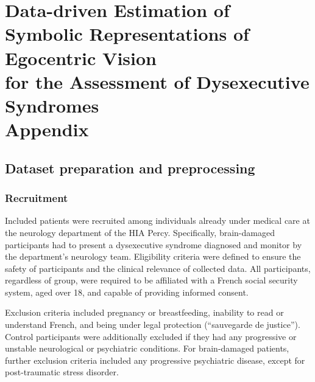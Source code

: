 \chapter[Appendix: Data-driven estimation of symbolic representations of egocentric vision for the assessment of dysexecutive syndromes]{Data-driven Estimation of \\Symbolic Representations of Egocentric Vision \\ for the Assessment of Dysexecutive Syndromes \\ Appendix}
\label{appendix:part_2}



\section{Dataset preparation and preprocessing}
\label{apd:chapter_4_dataset_preparation}

\subsection{Recruitment}
\label{apd:chapter_4_methods}


Included patients were recruited among individuals already under medical care at the neurology department of the HIA Percy. Specifically, brain-damaged participants had to present a dysexecutive syndrome diagnosed and monitor by the department’s neurology team. Eligibility criteria were defined to ensure the safety of participants and the clinical relevance of collected data. All participants, regardless of group, were required to be affiliated with a French social security system, aged over 18, and capable of providing informed consent. 

Exclusion criteria included pregnancy or breastfeeding, inability to read or understand French, and being under legal protection (“sauvegarde de justice”\footnotemark[1]).
 Control participants were additionally excluded if they had any progressive or unstable neurological or psychiatric conditions. For brain-damaged patients, further exclusion criteria included any progressive psychiatric disease, except for post-traumatic stress disorder.

